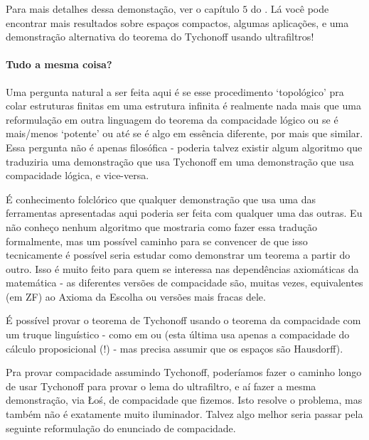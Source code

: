 \documentclass[11pt]{article}
\theoremstyle{definition}
\theoremstyle{definition}
\theoremstyle{definition}
\theoremstyle{definition}
\theoremstyle{definition}
\theoremstyle{definition}
\theoremstyle{definition}
\theoremstyle{definition}
\theoremstyle{definition}
\theoremstyle{definition}
\newtheorem*{example*}{Exemplo}
\newenvironment{exemplo*}{
\definecolor{shadecolor}{HTML}{b9e6d3}
\begin{shaded}
\begin{example*}
}
{
\end{example*}
\end{shaded}
}
\theoremstyle{definition}
\theoremstyle{definition}
\theoremstyle{definition}
\begin{document}
Para mais detalhes dessa demonstação, ver o capítulo $5$ do \cite{aurichi}. Lá você pode encontrar mais resultados sobre espaços compactos, algumas aplicações, e uma demonstração alternativa do teorema do Tychonoff usando ultrafiltros!

\begin{exemplo*}
\end{exemplo*}


\paragraph{Tudo a mesma coisa?} Uma pergunta natural a ser feita aqui é se esse procedimento `topológico' pra colar estruturas finitas em uma estrutura infinita é realmente nada mais que uma reformulação em outra linguagem do teorema da compacidade lógico ou se é mais/menos `potente' ou até se é algo em essência diferente, por mais que similar. Essa pergunta não é apenas filosófica - poderia talvez existir algum algoritmo que traduziria uma demonstração que usa Tychonoff em uma demonstração que usa compacidade lógica, e vice-versa.

É conhecimento folclórico que qualquer demonstração que usa uma das ferramentas apresentadas aqui poderia ser feita com qualquer uma das outras. Eu não conheço nenhum algoritmo que mostraria como fazer essa tradução formalmente, mas um possível caminho para se convencer de que isso tecnicamente é possível seria estudar como demonstrar um teorema a partir do outro. Isso é muito feito para quem se interessa nas dependências axiomáticas da matemática - as diferentes versões de compacidade são, muitas vezes, equivalentes (em ZF) ao Axioma da Escolha ou versões mais fracas dele.

É possível provar o teorema de Tychonoff usando o teorema da compacidade com um truque linguístico - como em \cite{tychonoffviacomp1} ou \cite{tychonoffviacomp2} (esta última usa apenas a compacidade do cálculo proposicional (!) - mas precisa assumir que os espaços são Hausdorff).

Pra provar compacidade assumindo Tychonoff, poderíamos fazer o caminho longo de usar Tychonoff para provar o lema do ultrafiltro, e aí fazer a mesma demonstração, via Łoś, de compacidade que fizemos. Isto resolve o problema, mas também não é exatamente muito iluminador. Talvez algo melhor seria passar pela seguinte reformulação do enunciado de compacidade.
\end{document}
